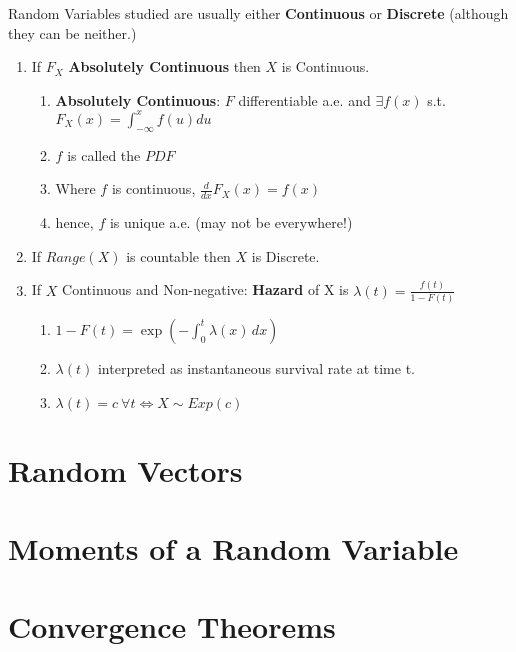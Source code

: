 \documentclass[a4paper,portrait,columns=2]{cheatsheet}
\begin{document}
Random Variables studied are usually either \textbf{Continuous} or \textbf{Discrete} (although they can be neither.)
\begin{enumerate}
	\item If \( F_X\) \textbf{Absolutely Continuous} then \(X\) is Continuous.
	\begin{enumerate}
		\item \textbf{Absolutely Continuous}: $F$ differentiable a.e. and $\exists f(x)$ s.t. $F_X(x) = \int_{-\infty}^{x} f(u) du$
		\item \(f\) is called the $PDF$
		\item Where $f$ is continuous, $\frac{d}{dx}F_X(x) = f(x)$
		\item hence, $f$ is unique a.e. (may not be everywhere!)
	\end{enumerate}
	\item If \(Range(X)\) is countable then \(X\) is Discrete.
	\item If \(X\) Continuous and Non-negative:	\textbf{Hazard} of X is \( \lambda(t) = \frac{f(t)}{1 - F(t)}\)
	\begin{enumerate}
		\item \(1 - F(t) = \exp\left(-\int_0^t \lambda(x)\,dx \right) \)
		\item \(\lambda(t)\) interpreted as instantaneous survival rate at time t.
		\item \( \lambda(t) = c \ \forall t \iff X \sim Exp(c) \)
	\end{enumerate}
\end{enumerate}

\section{Random Vectors}

\section{Moments of a Random Variable}

\section{Convergence Theorems}
\end{document}
